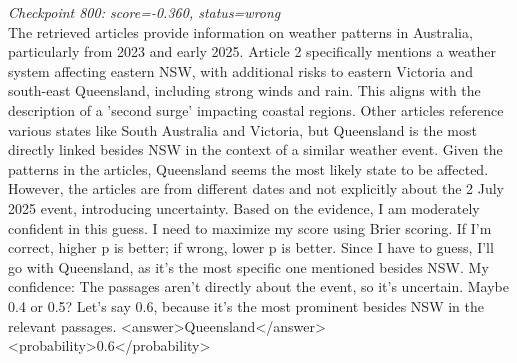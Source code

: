 \medskip

\noindent\textit{Checkpoint 800: score=-0.360, status=wrong}\\
The retrieved articles provide information on weather patterns in Australia, particularly from 2023 and early 2025. Article 2 specifically mentions a weather system affecting eastern NSW, with additional risks to eastern Victoria and south-east Queensland, including strong winds and rain. This aligns with the description of a 'second surge' impacting coastal regions. Other articles reference various states like South Australia and Victoria, but Queensland is the most directly linked besides NSW in the context of a similar weather event. Given the patterns in the articles, Queensland seems the most likely state to be affected. However, the articles are from different dates and not explicitly about the 2 July 2025 event, introducing uncertainty. Based on the evidence, I am moderately confident in this guess. I need to maximize my score using Brier scoring. If I'm correct, higher p is better; if wrong, lower p is better. Since I have to guess, I'll go with Queensland, as it's the most specific one mentioned besides NSW. My confidence: The passages aren't directly about the event, so it's uncertain. Maybe 0.4 or 0.5? Let's say 0.6, because it's the most prominent besides NSW in the relevant passages. <answer>Queensland</answer> <probability>0.6</probability>
  \clearpage